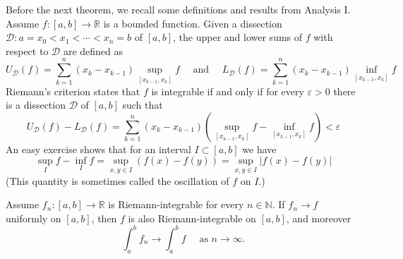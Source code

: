 \documentclass[a4paper]{article}
\begin{document}
Before the next theorem, we recall some definitions and results from Analysis I. Assume $f:[a, b] \rightarrow \mathbb{R}$ is a bounded function. Given a dissection $\mathcal{D}: a=x_{0}<x_{1}<\cdots<x_{n}=b$ of $[a, b]$, the upper and lower sums of $f$ with respect to $\mathcal{D}$ are defined as
\[
U_{\mathcal{D}}(f)=\sum_{k=1}^{n}\left(x_{k}-x_{k-1}\right) \sup _{\left[x_{k-1}, x_{k}\right]} f \quad \text { and } \quad L_{\mathcal{D}}(f)=\sum_{k=1}^{n}\left(x_{k}-x_{k-1}\right) \inf _{\left[x_{k-1}, x_{k}\right]} f
\]
Riemann's criterion states that $f$ is integrable if and only if for every $\varepsilon>0$ there is a dissection $\mathcal{D}$ of $[a, b]$ such that
\[
U_{\mathcal{D}}(f)-L_{\mathcal{D}}(f)=\sum_{k=1}^{n}\left(x_{k}-x_{k-1}\right)\left(\sup _{\left[x_{k-1}, x_{k}\right]} f-\inf _{\left[x_{k-1}, x_{k}\right]} f\right)<\varepsilon
\]
An easy exercise shows that for an interval $I \subset[a, b]$ we have
\[
\sup _{I} f-\inf _{I} f=\sup _{x, y \in I}(f(x)-f(y))=\sup _{x, y \in I}|f(x)-f(y)|
\]
(This quantity is sometimes called the oscillation of $f$ on $I$.)

\begin{theorem}\label{theorem 3}
    Assume $f_{n}:[a, b] \rightarrow \mathbb{R}$ is Riemann-integrable for every $n \in \mathbb{N}$. If $f_{n} \rightarrow f$ uniformly on $[a, b]$, then $f$ is also Riemann-integrable on $[a, b]$, and moreover
    \[
    \int_{a}^{b} f_{n} \rightarrow \int_{a}^{b} f \quad \text { as } n \rightarrow \infty.
    \]
\end{theorem}
\end{document}
